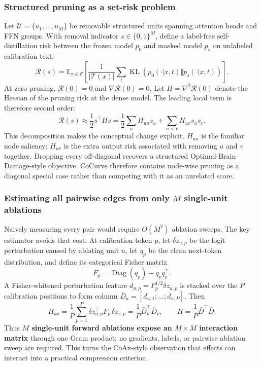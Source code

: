 \documentclass[12pt,a4paper]{article}
\newcommand{\method}[1]{{\sffamily\bfseries\color{MethodBlue}#1}}
\newcommand{\XDB}{\method{XDomainBench}}
\newcommand{\SubspacePath}{\method{SubspacePath Pruner}}
\newcommand{\CoCurve}{\method{CoCurve}}
\newcommand{\AnchorPath}{\method{AnchorPath}}
\newcommand{\CoAx}{\method{CoAx}}
\def\method#1{#1}\def\XDB{XDomainBench}\def\SubspacePath{SubspacePath Pruner}%
\def\CoCurve{CoCurve}\def\AnchorPath{AnchorPath}\def\CoAx{CoAx}%
\begin{document}
\subsubsection{Structured pruning as a set-risk problem}
Let $\mathcal U=\{u_1,\ldots,u_M\}$ be removable structured units spanning attention heads and FFN groups. With removal indicator $s\in\{0,1\}^M$, define a label-free self-distillation risk between the frozen model $p_0$ and masked model $p_s$ on unlabeled calibration text:
\begin{equation}
\mathcal R(s)=\mathbb E_{x\in\mathcal C}\left[
\frac{1}{|\mathcal T(x)|}\sum_t
\operatorname{KL}\!\left(p_0(\cdot|x,t)\Vert p_s(\cdot|x,t)\right)
\right].
\label{eq:cc-risk}
\end{equation}
At zero pruning, $\mathcal R(0)=0$ and $\nabla\mathcal R(0)=0$. Let $H=\nabla^2\mathcal R(0)$ denote the Hessian of the pruning risk at the dense model. The leading local term is therefore second order:
\begin{equation}
\mathcal R(s)\approx \frac12 s^\top H s
=\frac12\sum_u H_{uu}s_u+\sum_{u<v}H_{uv}s_us_v.
\label{eq:cc-quadratic}
\end{equation}
This decomposition makes the conceptual change explicit. $H_{uu}$ is the familiar node saliency; $H_{uv}$ is the extra output risk associated with removing $u$ and $v$ together. Dropping every off-diagonal recovers a structured Optimal-Brain-Damage-style objective. \CoCurve{} therefore contains node-wise pruning as a diagonal special case rather than competing with it as an unrelated score.

\subsubsection{Estimating all pairwise edges from only $M$ single-unit ablations}
Naively measuring every pair would require $O(M^2)$ ablation sweeps. The key estimator avoids that cost. At calibration token $p$, let $\delta z_{u,p}$ be the logit perturbation caused by ablating unit $u$, let $q_p$ be the clean next-token distribution, and define its categorical Fisher matrix
\begin{equation}
F_p=\operatorname{Diag}(q_p)-q_pq_p^\top .
\label{eq:cc-fisher}
\end{equation}
A Fisher-whitened perturbation feature $d_{u,p}=F_p^{1/2}\delta z_{u,p}$ is stacked over the $P$ calibration positions to form column $\bar D_u=[d_{u,1};\ldots;d_{u,P}]$. Then
\begin{equation}
H_{uv}=\frac1P\sum_{p=1}^{P}\delta z_{u,p}^{\top}F_p\,\delta z_{v,p}
=\frac{1}{P}\bar D_u^\top\bar D_v,
\qquad
H=\frac{1}{P}\bar D^\top\bar D.
\label{eq:cc-gram}
\end{equation}
Thus \textbf{$M$ single-unit forward ablations expose an $M\times M$ interaction matrix} through one Gram product; no gradients, labels, or pairwise ablation sweep are required. This turns the CoAx-style observation that effects can interact into a practical compression criterion.
\end{document}
